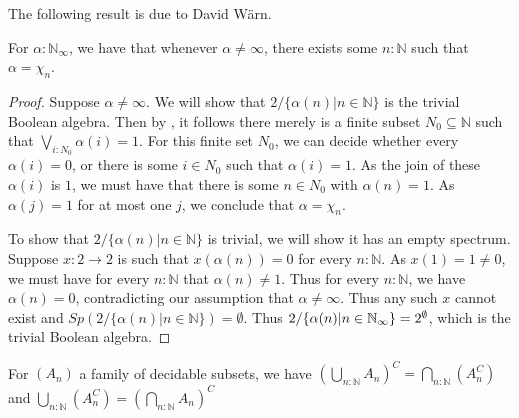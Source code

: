 \documentclass{../util/zariski-small}
\begin{document}
The following result is due to David W\"arn.
\begin{theorem}
  For $\alpha:\mathbb N_\infty$, we have that whenever $\alpha\neq \infty$, 
  there exists some $n:\mathbb N$ such that $\alpha = \chi_n$. 
\end{theorem}
\begin{proof}
  Suppose $\alpha \neq \infty$.%
  We will show that $2/\{\alpha(n)|n\in\mathbb N\}$ is the trivial Boolean algebra. 
  Then by , it follows there merely is a finite subset $N_0\subseteq \mathbb N$ 
  such that $\bigvee_{i:N_0}\alpha(i) =1$.
  For this finite set $N_0$, we can decide whether every $\alpha(i) =0$, 
  or there is some $i\in N_0$ such that $\alpha(i) =1$.
  As the join of these $\alpha(i)$ is $1$, we must have that there is some $n\in N_0$ with $\alpha(n) = 1$. 
  As $\alpha(j)=1$ for at most one $j$, we conclude that $\alpha = \chi_n$. 

  To show that $2/\{\alpha(n)|n\in\mathbb N\}$ is trivial, we will show it has an empty spectrum. 
  Suppose $x: 2 \to 2$ is such that $x(\alpha(n)) = 0$ for every $n:\mathbb N$. 
  As $x(1) = 1\neq 0$, we must have for every $n:\mathbb N$ that $\alpha(n) \neq 1$. 
  Thus for every $n:\mathbb N$, we have $\alpha(n) = 0$, contradicting our assumption that $\alpha \neq \infty$. 
  Thus any such $x$ cannot exist and $Sp(2/\{\alpha(n)|n\in\mathbb N\}) = \emptyset$. 
  Thus $2/\{\alpha(n) | n \in \mathbb{N}_{\infty} \} = 2^\emptyset$, which is the trivial Boolean algebra. 
\end{proof}
\begin{corollary}\label{LemDecidableSubsetsDeMorgan}
  For $(A_n)$ a family of decidable subsets, we have
    $
    (\bigcup_{n:\mathbb N} A_n)^C
    =
    \bigcap_{n:\mathbb N} (A_n^C)
    $ 
    and 
    $
    \bigcup_{n:\mathbb N} (A_n^C)
    =  
    (\bigcap_{n:\mathbb N} A_n)^C
    $
\end{corollary}
\end{document}
